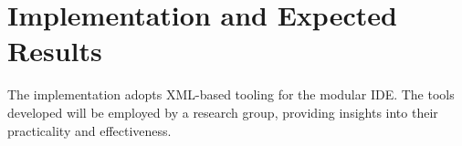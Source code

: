 \section{Implementation and Expected Results}

The implementation adopts XML-based tooling for the modular IDE. The tools
developed will be employed by a research group, providing insights into their
practicality and effectiveness.
